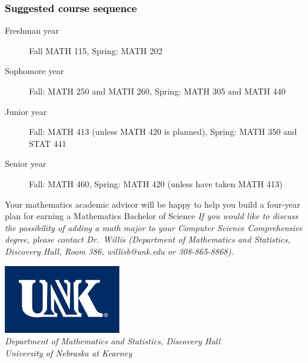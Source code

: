 \documentclass[10pt]{article}
\newenvironment{mypar}[2]
   {\begin{list}{}%
     {\setlength\leftmargin{#1}
     \setlength\rightmargin{#2}}
     \item[]}
   {\end{list}}
\begin{document}
\begin{center} \fbox{
  {\textcolor{unkblue}{For a suggested course sequence, see the next page.}}}
\end{center}
\subsubsection*{\textcolor{black}{Suggested course sequence}}

\begin{description}
   \item[\phantom{xxx} Freshman year] Fall MATH 115, Spring: MATH 202
      \item[\phantom{xxx} Sophomore year]  Fall: MATH 250 and MATH 260,   Spring: MATH 305 and MATH 440
     \item[\phantom{xxx} Junior year]  Fall: MATH 413 (unless MATH 420 is planned),  Spring: MATH 350 and STAT 441
      \item[\phantom{xxx} Senior year]  Fall: MATH 460,  Spring: MATH 420 (unless have taken MATH 413)
 \end{description}

\begin{mypar}{0.5cm}{0.5cm}  Your mathematics academic advisor will be happy to help you build a four-year plan for earning a Mathematics Bachelor of Science  \textcolor{unkblue}{\emph{If you would like to discuss the possibility of  adding a math major to your Computer Science Comprehensive degree, please contact \mbox{Dr.\ Willis} (Department of Mathematics and Statistics,  Discovery Hall, Room 386, willisb@unk.edu or 308-865-8868).}}
\end{mypar}


\newpage

\begin{flushleft}
\includegraphics[scale=0.25]{unk-logo}\\
 \emph{\textcolor{unkblue}{Department of Mathematics and Statistics, Discovery Hall}} \\
  \emph{\textcolor{unkblue}{University of Nebraska at Kearney}}
\end{flushleft}
\end{document}
